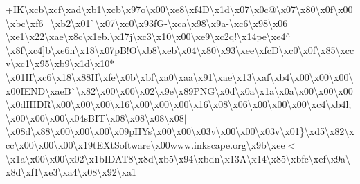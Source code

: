 +I\+K\textbackslash{}xcb\textbackslash{}xcf\textbackslash{}xad\textbackslash{}xb1\textbackslash{}xcb\textbackslash{}x97o\textbackslash{}x00\textbackslash{}xe8\textbackslash{}xf4\+D\textbackslash{}x1d\textbackslash{}x07\textbackslash{}x0c@\textbackslash{}x07\textbackslash{}x80\textbackslash{}x0f\textbackslash{}x00\textbackslash{}xbc\textbackslash{}xf6\+\_\+\textbackslash{}xb2\textbackslash{}x01\`{}\textbackslash{}x07\textbackslash{}xc0\textbackslash{}x93f\+G-\/\textbackslash{}xca\textbackslash{}x98\textbackslash{}x9a-\/\textbackslash{}xc6\textbackslash{}x98\textbackslash{}x06 \textbackslash{}xe1\textbackslash{}x22\textbackslash{}xae\textbackslash{}x8c\textbackslash{}x1eb.\textbackslash{}x17j\textbackslash{}xc3\textbackslash{}x10\textbackslash{}x00\textbackslash{}xe9\textbackslash{}xc2q!\textbackslash{}x14pe\textbackslash{}xe4$^\wedge$\textbackslash{}x8f\textbackslash{}xc4\mbox{]}b\textbackslash{}xe6n\textbackslash{}x18\textbackslash{}x07p\+B!\+O\textbackslash{}xb8\textbackslash{}xeb\textbackslash{}x04\textbackslash{}x80\textbackslash{}x93\textbackslash{}xee\textbackslash{}xfc\+D\textbackslash{}xc0\textbackslash{}x0f\textbackslash{}x85\textbackslash{}xccv\textbackslash{}xc1\textbackslash{}x95\textbackslash{}xb9\textbackslash{}x1d\textbackslash{}x10$\ast$\textbackslash{}x01\+H\textbackslash{}xc6\textbackslash{}x18\textbackslash{}x88\+H\textbackslash{}xfe\textbackslash{}x0b\textbackslash{}xbf\textbackslash{}xa0\textbackslash{}xaa\textbackslash{}x91\textbackslash{}xae\textbackslash{}x13\textbackslash{}xaf\textbackslash{}xb4\textbackslash{}x00\textbackslash{}x00\textbackslash{}x00\textbackslash{}x00\+I\+E\+N\+D\textbackslash{}xae\+B\`{}\textbackslash{}x82\textbackslash{}x00\textbackslash{}x00\textbackslash{}x02\textbackslash{}x9e\textbackslash{}x89\+P\+N\+G\textbackslash{}x0d\textbackslash{}x0a\textbackslash{}x1a\textbackslash{}x0a\textbackslash{}x00\textbackslash{}x00\textbackslash{}x00\textbackslash{}x0d\+I\+H\+D\+R\textbackslash{}x00\textbackslash{}x00\textbackslash{}x00\textbackslash{}x16\textbackslash{}x00\textbackslash{}x00\textbackslash{}x00\textbackslash{}x16\textbackslash{}x08\textbackslash{}x06\textbackslash{}x00\textbackslash{}x00\textbackslash{}x00\textbackslash{}xc4\textbackslash{}xb4l;\textbackslash{}x00\textbackslash{}x00\textbackslash{}x00\textbackslash{}x04s\+B\+I\+T\textbackslash{}x08\textbackslash{}x08\textbackslash{}x08\textbackslash{}x08$\vert$\textbackslash{}x08d\textbackslash{}x88\textbackslash{}x00\textbackslash{}x00\textbackslash{}x00\textbackslash{}x09p\+H\+Ys\textbackslash{}x00\textbackslash{}x00\textbackslash{}x03v\textbackslash{}x00\textbackslash{}x00\textbackslash{}x03v\textbackslash{}x01\}\textbackslash{}xd5\textbackslash{}x82\textbackslash{}xcc\textbackslash{}x00\textbackslash{}x00\textbackslash{}x00\textbackslash{}x19t\+E\+Xt\+Software\textbackslash{}x00www.\+inkscape.\+org\textbackslash{}x9b\textbackslash{}xee$<$\textbackslash{}x1a\textbackslash{}x00\textbackslash{}x00\textbackslash{}x02\textbackslash{}x1b\+I\+D\+A\+T8\textbackslash{}x8d\textbackslash{}xb5\textbackslash{}x94\textbackslash{}xbdn\textbackslash{}x13\+A\textbackslash{}x14\textbackslash{}x85\textbackslash{}xbfc\textbackslash{}xef\textbackslash{}x9a\textbackslash{}x8d\textbackslash{}xf1\textbackslash{}xe3\textbackslash{}xa4\textbackslash{}x08\textbackslash{}x92\textbackslash{}xa1\text